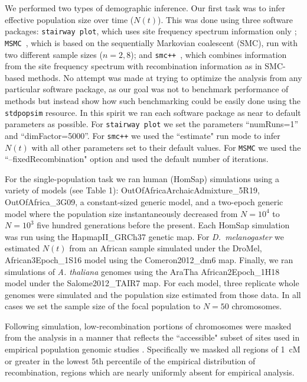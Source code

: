\documentclass[12pt,halfline,a4paper]{ouparticle}
\newcommand{\stdpopsim}{\texttt{stdpopsim}\xspace}
\newcommand{\MSMC}{\texttt{MSMC}\xspace}
\newcommand{\smcpp}{\texttt{smc++}\xspace}
\newcommand{\stairwayplot}{\texttt{stairway plot}\xspace}
\begin{document}
We performed two types of demographic inference.
Our first task was to infer effective population size over time ($N(t)$).
This was done using three software packages: \stairwayplot,
which uses site frequency spectrum information only \citep{liu2015exploring};
\MSMC~\citep{schiffels2014inferring},
which is based on the sequentially Markovian coalescent (SMC),
run with two different sample sizes ($n = 2 , 8$);
and \smcpp~\citep{terhorst2017robust},
which combines information from the site frequency spectrum with
recombination information as in SMC-based methods. No attempt
was made at trying to optimize the analysis from
any particular software package,
as our goal was not to benchmark performance of methods but
instead show how such benchmarking could be easily done using
the \stdpopsim resource. In this spirit we ran each software package as near
to default parameters as possible. For \stairwayplot we
set the parameters ``numRuns=1'' and ``dimFactor=5000''. For \smcpp we used the
``estimate" run mode to infer $N(t)$ with all other parameters set
to their default values. For \MSMC we used the ``--fixedRecombination"
option and used the default number of iterations.

For the single-population task we ran human (HomSap) simulations
using a variety of models (see Table 1): OutOfAfricaArchaicAdmixture\_5R19, OutOfAfrica\_3G09,
a constant-sized generic model, and a two-epoch generic model where the
population size instantaneously decreased from $N=10^4$ to $N=10^3$
five hundred generations before the present. Each HomSap simulation was run
using the HapmapII\_GRCh37 genetic map. For \textit{D.~melanogaster}
we estimated $N(t)$ from an African sample simulated under the DroMel,
African3Epoch\_1S16 model using the Comeron2012\_dm6 map.
Finally, we ran simulations of \emph{A. thaliana} genomes using the 
AraTha African2Epoch\_1H18 model under the Salome2012\_TAIR7 map.
For each model, three replicate whole genomes were
simulated and the population size estimated from those data. In all cases we
set the sample size of the focal population to $N=50$ chromosomes.

Following simulation, low-recombination portions of chromosomes were masked
from the analysis in a manner that reflects the ``accessible" subset of sites
used in empirical population genomic studies \citep[e.g.,][]{danecek20111000,langley2012genomic}.
Specifically we masked all regions of \SI{1}{cM} or greater in the lowest 5th percentile of the empirical
distribution of recombination, regions which are nearly uniformly absent for
empirical analysis.
\end{document}
